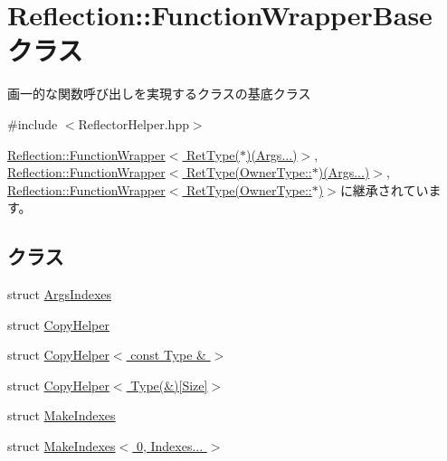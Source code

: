 \hypertarget{class_reflection_1_1_function_wrapper_base}{}\section{Reflection\+:\+:Function\+Wrapper\+Base クラス}
\label{class_reflection_1_1_function_wrapper_base}


画一的な関数呼び出しを実現するクラスの基底クラス 




{\ttfamily \#include $<$Reflector\+Helper.\+hpp$>$}



\hyperlink{class_reflection_1_1_function_wrapper_3_01_ret_type_07_5_08_07_args_8_8_8_08_4}{Reflection\+::\+Function\+Wrapper$<$ Ret\+Type($\ast$)(\+Args...)$>$}, \hyperlink{class_reflection_1_1_function_wrapper_3_01_ret_type_07_owner_type_1_1_5_08_07_args_8_8_8_08_4}{Reflection\+::\+Function\+Wrapper$<$ Ret\+Type(\+Owner\+Type\+::$\ast$)(\+Args...)$>$}, \hyperlink{class_reflection_1_1_function_wrapper_3_01_ret_type_07_owner_type_1_1_5_08_4}{Reflection\+::\+Function\+Wrapper$<$ Ret\+Type(\+Owner\+Type\+::$\ast$)$>$}に継承されています。

\subsection*{クラス}
\begin{DoxyCompactItemize}
\item 
struct \hyperlink{struct_reflection_1_1_function_wrapper_base_1_1_args_indexes}{Args\+Indexes}
\item 
struct \hyperlink{struct_reflection_1_1_function_wrapper_base_1_1_copy_helper}{Copy\+Helper}
\item 
struct \hyperlink{struct_reflection_1_1_function_wrapper_base_1_1_copy_helper_3_01const_01_type_01_6_01_4}{Copy\+Helper$<$ const Type \& $>$}
\item 
struct \hyperlink{struct_reflection_1_1_function_wrapper_base_1_1_copy_helper_3_01_type_07_6_08[_size]_4}{Copy\+Helper$<$ Type(\&)\mbox{[}\+Size\mbox{]}$>$}
\item 
struct \hyperlink{struct_reflection_1_1_function_wrapper_base_1_1_make_indexes}{Make\+Indexes}
\item 
struct \hyperlink{struct_reflection_1_1_function_wrapper_base_1_1_make_indexes_3_010_00_01_indexes_8_8_8_01_4}{Make\+Indexes$<$ 0, Indexes... $>$}
\end{DoxyCompactItemize}
